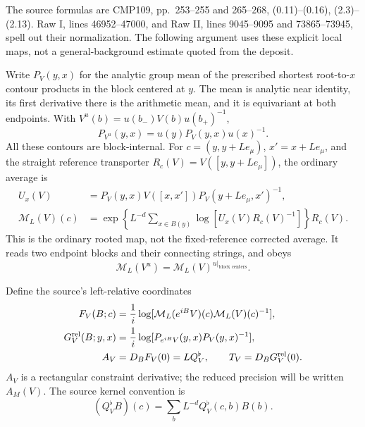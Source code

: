 \documentclass[11pt]{article}
\theoremstyle{remark}
\begin{document}
The source formulas are CMP109, pp.~253--255 and 265--268,
(0.11)--(0.16), (2.3)--(2.13). Raw I, lines 46952--47000, and
Raw II, lines 9045--9095 and 73865--73945, spell out their
normalization. The following argument uses these explicit local
maps, not a general-background estimate quoted from the deposit.

Write $P_V(y,x)$ for the analytic group mean of the prescribed
shortest root-to-$x$ contour products in the block centered at
$y$. The mean is analytic near identity, its first derivative
there is the arithmetic mean, and it is equivariant at both
endpoints. With $V^u(b)=u(b_-)V(b)u(b_+)^{-1}$,
\begin{equation}\label{pc-contour-gauge}
 P_{V^u}(y,x)=u(y)P_V(y,x)u(x)^{-1}.
\end{equation}
All these contours are block-internal. For
$c=(y,y+Le_\mu)$, $x'=x+Le_\mu$, and the straight reference
transporter $R_c(V)=V([y,y+Le_\mu])$, the ordinary average is
\begin{equation}\label{pc-ordinary-map}
 \begin{split}
 U_x(V)&=P_V(y,x)V([x,x'])P_V(y+Le_\mu,x')^{-1},\\
 \mathcal M_L(V)(c)&=
 \exp\left\{L^{-d}\sum_{x\in B(y)}
      \log[U_x(V)R_c(V)^{-1}]\right\}R_c(V).
 \end{split}
\end{equation}
This is the ordinary rooted map, not the fixed-reference
corrected average. It reads two endpoint blocks and their
connecting strings, and obeys
\[
 \mathcal M_L(V^u)=
 \mathcal M_L(V)^{u|_{\text{block centers}}}.
\]

Define the source's left-relative coordinates
\begin{equation}\label{pc-relative-maps}
 \begin{split}
 F_V(B;c)&=\frac1i\log[
  \mathcal M_L(e^{iB}V)(c)\mathcal M_L(V)(c)^{-1}],\\
 G^{\rm rel}_V(B;y,x)&=\frac1i\log[
  P_{e^{iB}V}(y,x)P_V(y,x)^{-1}],\\
 A_V&=D_BF_V(0)=LQ_V^\flat,\qquad
 T_V=D_BG^{\rm rel}_V(0).
 \end{split}
\end{equation}
$A_V$ is a rectangular constraint derivative; the reduced
precision will be written $A_M(V)$. The source kernel convention is
\begin{equation}\label{pc-kernel-convention}
 (Q_V^\flat B)(c)=\sum_b L^{-d}Q_V^\flat(c,b)B(b).
\end{equation}
\end{document}
